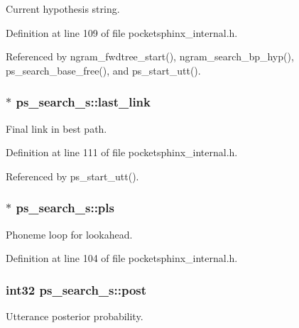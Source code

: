 Current hypothesis string. 



Definition at line 109 of file pocketsphinx\+\_\+internal.\+h.



Referenced by ngram\+\_\+fwdtree\+\_\+start(), ngram\+\_\+search\+\_\+bp\+\_\+hyp(), ps\+\_\+search\+\_\+base\+\_\+free(), and ps\+\_\+start\+\_\+utt().

\subsubsection[{last\+\_\+link}]{$\ast$ ps\+\_\+search\+\_\+s\+::last\+\_\+link}\label{structps__search__s_aa3020ef7bd4e56713dfe2fbad52e6e4f}


Final link in best path. 



Definition at line 111 of file pocketsphinx\+\_\+internal.\+h.



Referenced by ps\+\_\+start\+\_\+utt().

\subsubsection[{pls}]{$\ast$ ps\+\_\+search\+\_\+s\+::pls}\label{structps__search__s_a2a33b7698fb237b42e007788f65cd46c}


Phoneme loop for lookahead. 



Definition at line 104 of file pocketsphinx\+\_\+internal.\+h.

\subsubsection[{post}]{\setlength{\rightskip}{0pt plus 5cm}int32 ps\+\_\+search\+\_\+s\+::post}\label{structps__search__s_a721a656d0e34f7604ea8c52a1bdf14ff}


Utterance posterior probability. 



